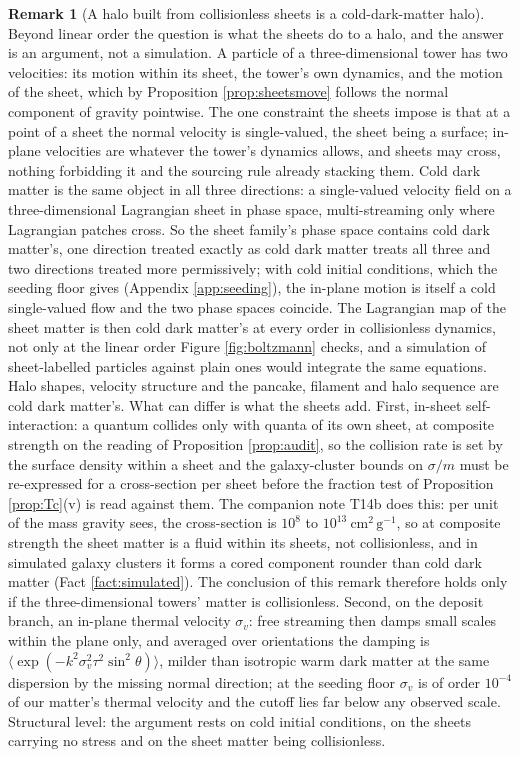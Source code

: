 \documentclass[11pt]{article}
\theoremstyle{definition}
\newtheorem{remark}[theorem]{Remark}
\begin{document}
\begin{remark}[A halo built from collisionless sheets is a cold-dark-matter halo]\label{rem:halo}
Beyond linear order the question is what the sheets do to a halo, and the answer is an argument, not a simulation. A particle of a three-dimensional tower has two velocities: its motion within its sheet, the tower's own dynamics, and the motion of the sheet, which by Proposition \ref{prop:sheetsmove} follows the normal component of gravity pointwise. The one constraint the sheets impose is that at a point of a sheet the normal velocity is single-valued, the sheet being a surface; in-plane velocities are whatever the tower's dynamics allows, and sheets may cross, nothing forbidding it and the sourcing rule already stacking them. Cold dark matter is the same object in all three directions: a single-valued velocity field on a three-dimensional Lagrangian sheet in phase space, multi-streaming only where Lagrangian patches cross. So the sheet family's phase space contains cold dark matter's, one direction treated exactly as cold dark matter treats all three and two directions treated more permissively; with cold initial conditions, which the seeding floor gives (Appendix \ref{app:seeding}), the in-plane motion is itself a cold single-valued flow and the two phase spaces coincide. The Lagrangian map of the sheet matter is then cold dark matter's at every order in collisionless dynamics, not only at the linear order Figure \ref{fig:boltzmann} checks, and a simulation of sheet-labelled particles against plain ones would integrate the same equations. Halo shapes, velocity structure and the pancake, filament and halo sequence are cold dark matter's. What can differ is what the sheets add. First, in-sheet self-interaction: a quantum collides only with quanta of its own sheet, at composite strength on the reading of Proposition \ref{prop:audit}, so the collision rate is set by the surface density within a sheet and the galaxy-cluster bounds on $\sigma/m$ must be re-expressed for a cross-section per sheet before the fraction test of Proposition \ref{prop:Tc}(v) is read against them. The companion note T14b does this: per unit of the mass gravity sees, the cross-section is $10^{8}$ to $10^{13}\ \mathrm{cm^{2}\,g^{-1}}$, so at composite strength the sheet matter is a fluid within its sheets, not collisionless, and in simulated galaxy clusters it forms a cored component rounder than cold dark matter (Fact \ref{fact:simulated}). The conclusion of this remark therefore holds only if the three-dimensional towers' matter is collisionless. Second, on the deposit branch, an in-plane thermal velocity $\sigma_{v}$: free streaming then damps small scales within the plane only, and averaged over orientations the damping is $\langle\exp(-k^{2}\sigma_{v}^{2}\tau^{2}\sin^{2}\theta)\rangle$, milder than isotropic warm dark matter at the same dispersion by the missing normal direction; at the seeding floor $\sigma_{v}$ is of order $10^{-4}$ of our matter's thermal velocity and the cutoff lies far below any observed scale. Structural level: the argument rests on cold initial conditions, on the sheets carrying no stress and on the sheet matter being collisionless.
\end{remark}
\end{document}
